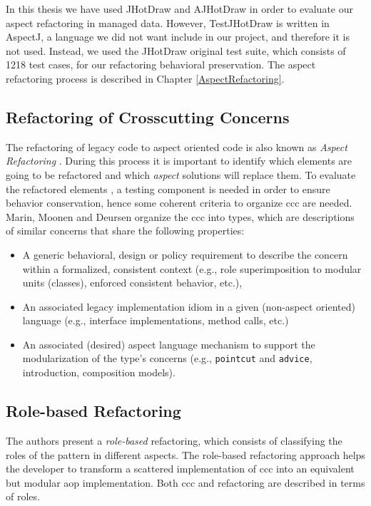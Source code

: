 In this thesis we have used JHotDraw and AJHotDraw in order to evaluate our aspect refactoring in managed data.
However, TestJHotDraw is written in AspectJ, a language we did not want include in our project, and therefore it is not used.
Instead, we used the JHotDraw original test suite, which consists of 1218 test cases, for our refactoring behavioral preservation.
The aspect refactoring process is described in Chapter \ref{AspectRefactoring}.

\subsection{Refactoring of Crosscutting Concerns}\label{Refactoring of ccc}
The refactoring of legacy code to aspect oriented code is also known as \textit{Aspect Refactoring} \cite{marin2005approach}. 
During this process it is important to identify which elements are going to be refactored and which \textit{aspect} solutions will replace them. 
To evaluate the refactored elements \cite{fowler2009refactoring}, a testing component is needed in order to ensure behavior conservation, hence some coherent criteria to organize \ac{ccc} are needed. 
Marin, Moonen and Deursen \cite{marin2005approach} organize the \ac{ccc} into types, which are descriptions of similar concerns that share the following properties: 

\begin{itemize}
	\item A generic behavioral, design or policy requirement to describe the concern within a formalized, consistent context (e.g., role superimposition to modular units (classes), enforced consistent behavior, etc.),

	\item An associated legacy implementation idiom in a given (non-aspect oriented) language (e.g., interface implementations, method calls, etc.)

	\item An associated (desired) aspect language mechanism to support the modularization of the type's concerns (e.g., \texttt{pointcut} and \texttt{advice}, introduction, composition models).
\end{itemize}

\subsection{Role-based Refactoring}
The authors present a \textit{role-based} refactoring, which consists of classifying the roles of the pattern in different aspects.
The role-based refactoring approach helps the developer to transform a scattered implementation of \ac{ccc} into an equivalent but modular \ac{aop} implementation. 
Both \ac{ccc} and refactoring are described in terms of roles. 

